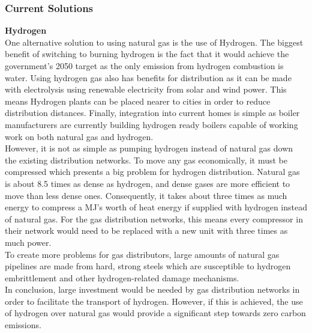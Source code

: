 \documentclass[11pt]{article}		%
\begin{document}
            \subsubsection[Current Solutions]{Current Solutions}
            \textbf{Hydrogen} \\
            One alternative solution to using natural gas is the use of Hydrogen. The biggest benefit of switching to burning hydrogen is the fact that it would achieve the government's 2050 target as the only emission from hydrogen combustion is water. Using hydrogen gas also has benefits for distribution as it can be made with electrolysis using renewable electricity from solar and wind power. This means Hydrogen plants can be placed nearer to cities in order to reduce distribution distances. Finally, integration into current homes is simple as boiler manufacturers are currently building hydrogen ready boilers capable of working work on both natural gas and hydrogen.\\
            \hspace*{3ex}However, it is not as simple as pumping hydrogen instead of natural gas down the existing distribution networks. To move any gas economically, it must be compressed which presents a big problem for hydrogen distribution. Natural gas is about 8.5 times as dense as hydrogen, and dense gases are more efficient to move than less dense ones. Consequently, it takes about three times as much energy to compress a MJ’s worth of heat energy if supplied with hydrogen instead of natural gas. For the gas distribution networks, this means every compressor in their network would need to be replaced with a new unit with three times as much power.\\
            \hspace*{3ex}To create more problems for gas distributors, large amounts of natural gas pipelines are made from hard, strong steels which are susceptible to hydrogen embrittlement and other hydrogen-related damage mechanisms.\\
            \hspace*{3ex}In conclusion, large investment would be needed by gas distribution networks in order to facilitate the transport of hydrogen. However, if this is achieved, the use of hydrogen over natural gas would provide a significant step towards zero carbon emissions.\\ 
            
\end{document}
